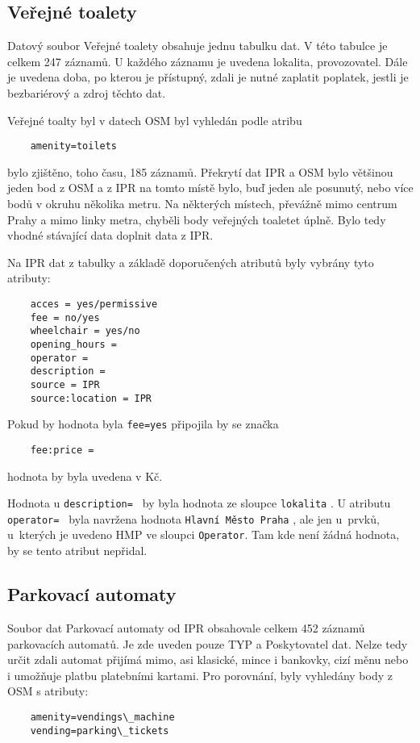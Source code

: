 \subsection{Veřejné toalety}
\label{Veřejné toalety}
Datový soubor Veřejné toalety obsahuje jednu tabulku dat. V této tabulce je 
celkem 247 záznamů. U každého záznamu je uvedena lokalita, provozovatel. 
Dále je uvedena doba, po kterou je přístupný, zdali je nutné zaplatit poplatek,
jestli je bezbariérový a zdroj těchto dat.

Veřejné toalty byl v datech OSM byl vyhledán podle atribu
\begin{verbatim}
    amenity=toilets
\end{verbatim}    

bylo zjištěno, toho času, 185 záznamů. Překrytí dat IPR a OSM bylo většinou 
jeden bod z OSM a z IPR na tomto místě bylo, buď jeden ale posunutý, nebo 
více bodů v okruhu několika metru. Na některých místech, převážně mimo centrum 
Prahy a mimo linky metra, chyběli body veřejných toaletet úplně. 
Bylo tedy vhodné stávající data doplnit data z IPR.

Na IPR dat z tabulky a základě doporučených atributů byly vybrány tyto atributy:
\begin{verbatim}
    acces = yes/permissive
    fee = no/yes
    wheelchair = yes/no 
    opening_hours = 
    operator = 
    description = 
    source = IPR
    source:location = IPR
\end{verbatim}
Pokud by hodnota byla {\tt fee=yes} připojila by se značka
\begin{verbatim}
    fee:price = 
\end{verbatim}    
hodnota by byla uvedena v Kč.

Hodnota u {\tt description= } by byla hodnota ze sloupce {\tt lokalita} .
U atributu {\tt operator= } byla navržena hodnota {\tt Hlavní Město Praha} , 
ale jen u~prvků, u~kterých je uvedeno HMP ve sloupci {\tt Operator}.
Tam kde není žádná hodnota, by se tento atribut nepřidal.



\subsection{Parkovací automaty}
\label{Parkovací automaty}
Soubor dat Parkovací automaty od IPR obsahovale celkem 452 záznamů parkovacích 
automatů. Je zde uveden pouze TYP a Poskytovatel dat. Nelze tedy určit zdali
automat přijímá mimo, asi klasické, mince i bankovky, cizí měnu nebo i umožňuje 
platbu platebními kartami.
Pro porovnání, byly vyhledány body z OSM s atributy:
\begin{verbatim}
    amenity=vendings\_machine
    vending=parking\_tickets
\end{verbatim}


